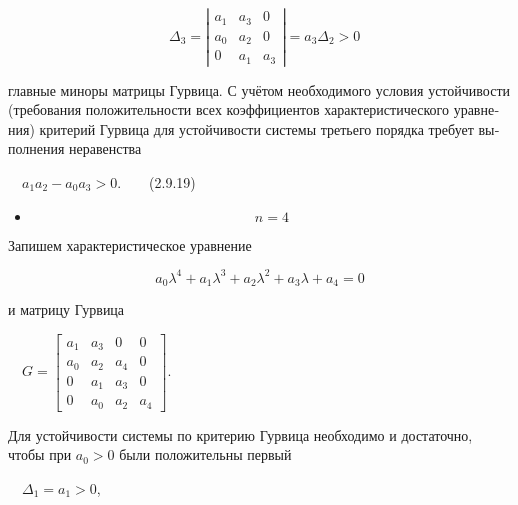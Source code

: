 \documentclass[a4paper]{article}
\newcommand\liststyleWWviiiNumviii{%
\renewcommand\theenumi{\arabic{enumi}}
\renewcommand\theenumii{\arabic{enumii}}
\renewcommand\theenumiii{\arabic{enumiii}}
\renewcommand\labelitemi{}
\renewcommand\labelenumi{\theenumi.}
\renewcommand\labelenumii{\theenumii.}
\renewcommand\labelenumiii{\theenumiii.}
}
\begin{document}
\begin{equation*}
\text{    }Δ_3=|\begin{matrix}a_1&a_3&0\\a_0&a_2&0\\0&a_1&a_3\end{matrix}|=a_3Δ_2>0
\end{equation*}
{\begin{russian}\sffamily
главные миноры матрицы Гурвица. С учётом необходимого условия устойчивости (требования положительности всех
коэффициентов характеристического уравнения) критерий Гурвица для устойчивости системы третьего порядка требует
выполнения неравенства
\end{russian}}

{\begin{russian}\sffamily
\ \  $a_1a_2-a_0a_3>0$.\ \ \ \ (2.9.19)
\end{russian}}

\liststyleWWviiiNumviii
\begin{itemize}
\item \begin{equation*}
n=4
\end{equation*}
\end{itemize}
{\begin{russian}\sffamily
Запишем характеристическое уравнение
\end{russian}}

\begin{equation*}
a_0λ^4+a_1λ^3+a_2λ^2+a_3λ+a_4=0
\end{equation*}
{\begin{russian}\sffamily
и матрицу Гурвица
\end{russian}}

{\begin{russian}\sffamily
\ \  $G=\left[\begin{matrix}a_1&a_3&0&0\\a_0&a_2&a_4&0\\0&a_1&a_3&0\\0&a_0&a_2&a_4\end{matrix}\right]$.
\end{russian}}

{\begin{russian}\sffamily
Для устойчивости системы по критерию Гурвица необходимо и достаточно, чтобы при  $a_0>0$ были положительны первый 
\end{russian}}

{\begin{russian}\sffamily
\ \  $Δ_1=a_1>0$,
\end{russian}}
\end{document}

